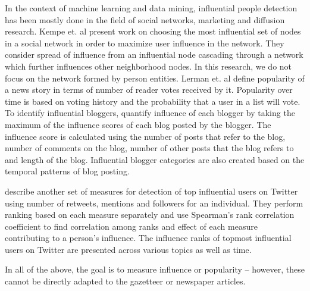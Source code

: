 In the context of machine learning and data mining, influential people detection has been mostly done in the field of social networks, marketing and diffusion research.
Kempe et. al \cite{kempe2003maximizing} present work on choosing the most influential set of nodes  in a social network in order to maximize user influence in the network. They consider spread of influence from an influential node cascading through a network which further influences other neighborhood nodes. In this research, we do not focus on the network formed by person entities. Lerman et. al \cite{lerman2010using} define popularity of a news story in terms of number of reader votes received by it. Popularity over time is based on voting history and the probability that a user in a list will vote. To identify influential bloggers, \cite{agarwal2008identifying} quantify influence of each blogger by taking the maximum of the influence scores of each blog posted by the blogger. The influence score is calculated using the number of posts that refer to the blog, number of comments on the blog, number of other posts that the blog refers to and length of the blog. Influential blogger categories are also created based on the temporal patterns of blog posting. 

\cite{cha2010measuring} describe another set of measures for detection of top influential users on Twitter using number of retweets, mentions and followers for an individual. They perform ranking based on each measure separately and use Spearman's rank correlation coefficient to find correlation among ranks and effect of each measure contributing to a person's influence. The influence ranks of topmost influential users on Twitter are presented across various topics as well as time.

In all of the above, the goal is to measure influence or popularity -- however, these cannot be directly adapted to the gazetteer or newspaper articles. 
